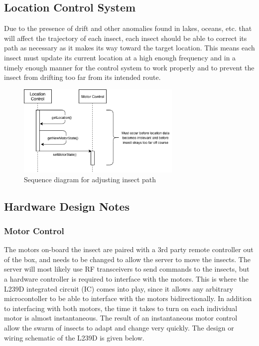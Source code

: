 \documentclass[11pt]{article}
\begin{document}
\subsection{Location Control System}
Due to the presence of drift and other anomalies found in lakes, oceans, etc. that will affect the trajectory of each insect, each insect should be able to correct its path as necessary as it makes its way toward the target location. This means each insect must update its current location at a high enough frequency and in a timely enough manner for the control system to work properly and to prevent the insect from drifting too far from its intended route.
\begin{figure}[H]
   \centering
   \includegraphics[width=0.7\textwidth]{diagram/location_control_sequence.png}
   \caption{Sequence diagram for adjusting insect path}
\end{figure}

\subsection{Hardware Design Notes}
\subsubsection{Motor Control}
The motors on-board the insect are paired with a 3rd party remote controller out of the box, and needs to be changed to allow the server to move the insects. The server will most likely use RF transceivers to send commands to the insects, but a hardware controller is required to interface with the motors. This is where the L239D integrated circuit (IC) comes into play, since it allows any arbitrary microcontoller to be able to interface with the motors bidirectionally. In addition to interfacing with both motors, the time it takes to turn on each individual motor is almost instantaneous. The result of an instantaneous motor control allow the swarm of insects to adapt and change very quickly. The design or wiring schematic of the L239D is given below. 
\end{document}
